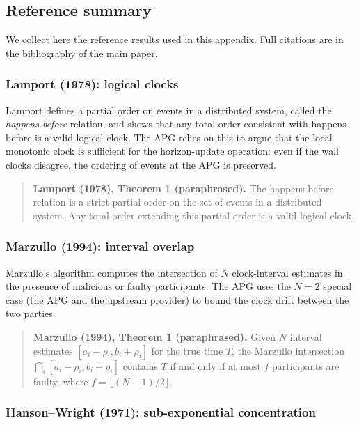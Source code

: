 \subsection{Reference summary}
\label{app:apg:bib}

We collect here the reference results used in this appendix.
Full citations are in the bibliography of the main paper.

\subsubsection{Lamport (1978): logical clocks}

Lamport defines a partial order on events in a distributed
system, called the \emph{happens-before} relation, and shows
that any total order consistent with happens-before is a
valid logical clock. The APG relies on this to argue that
the local monotonic clock is sufficient for the
horizon-update operation: even if the wall clocks disagree,
the ordering of events at the APG is preserved.

\begin{quote}
\textbf{Lamport (1978), Theorem 1 (paraphrased).} The
happens-before relation is a strict partial order on the set
of events in a distributed system. Any total order extending
this partial order is a valid logical clock.
\end{quote}

\subsubsection{Marzullo (1994): interval overlap}

Marzullo's algorithm computes the intersection of $N$
clock-interval estimates in the presence of malicious or
faulty participants. The APG uses the $N = 2$ special case
(the APG and the upstream provider) to bound the clock
drift between the two parties.

\begin{quote}
\textbf{Marzullo (1994), Theorem 1 (paraphrased).} Given $N$
interval estimates $[a_i - \rho_i, b_i + \rho_i]$ for the
true time $T$, the Marzullo intersection
$\bigcap_i [a_i - \rho_i, b_i + \rho_i]$ contains $T$ if
and only if at most $f$ participants are faulty, where
$f = \lfloor (N-1)/2 \rfloor$.
\end{quote}

\subsubsection{Hanson--Wright (1971): sub-exponential concentration}

